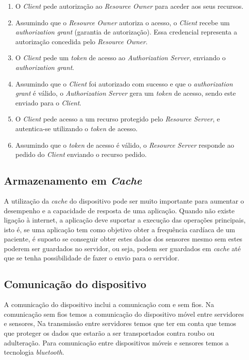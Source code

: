 \begin{enumerate}[label=(\Alph*)]
    \item O \textit{Client} pede autorização ao \textit{Resource Owner} para aceder aos seus recursos.
    \item Assumindo que o \textit{Resource Owner} autoriza o acesso, o \textit{Client} recebe um \textit{authorization grant} (garantia de autorização). Essa credencial representa a autorização concedida pelo \textit{Resource Owner}.
    \item O \textit{Client} pede um \textit{token} de acesso ao \textit{Authorization Server}, enviando o \textit{authorization grant}.
    \item Assumindo que o \textit{Client} foi autorizado com sucesso e que o \textit{authorization grant} é válido, o \textit{Authorization Server} gera um \textit{token} de acesso, sendo este enviado para o \textit{Client}.
    \item O \textit{Client} pede acesso a um recurso protegido pelo \textit{Resource Server}, e autentica-se utilizando o \textit{token} de acesso.
    \item Assumindo que o \textit{token} de acesso é válido, o \textit{Resource Server} responde ao pedido do \textit{Client} enviando o recurso pedido.
\end{enumerate}


\subsection{Armazenamento em \textit{Cache}}
A utilização da \textit{cache} do dispositivo pode ser muito importante para aumentar o desempenho e a capacidade de resposta de uma aplicação. Quando não existe ligação à internet, a aplicação deve suportar a execução das operações principais, isto é, se uma aplicação tem como objetivo obter a frequência cardíaca de um paciente, é suposto se conseguir obter estes dados dos sensores mesmo sem estes poderem ser guardados no servidor, ou seja, podem ser guardados em \textit{cache} até que se tenha possibilidade de fazer o envio para o servidor.


\subsection{Comunicação do dispositivo}
A comunicação do dispositivo inclui a comunicação com e sem fios. Na comunicação sem fios temos a comunicação do dispositivo móvel entre servidores e sensores, Na transmissão entre servidores temos que ter em conta que temos que proteger os dados que estarão a ser transportados contra roubo ou adulteração. Para comunicação entre dispositivos móveis e sensores temos a tecnologia \textit{bluetooth}.


